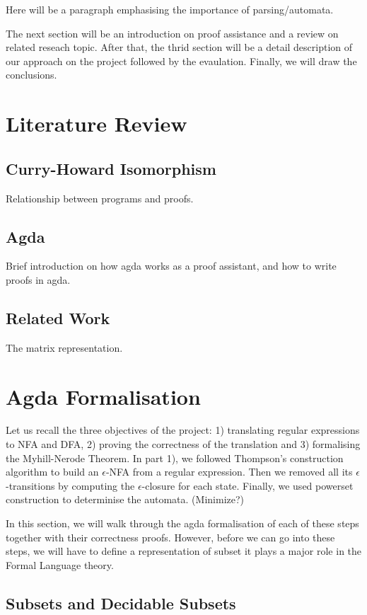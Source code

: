 \documentclass[twoside,openright,final]{bhamthesis}
\begin{document}
\par Here will be a paragraph emphasising the importance of
parsing/automata. 

\par The next section will be an introduction on proof assistance and
a review on related reseach topic. After that, the thrid section will
be a detail description of our approach on the project followed by the
evaulation. Finally, we will draw the conclusions. 


\section{Literature Review}
\subsection{Curry-Howard Isomorphism}
Relationship between programs and proofs.
\subsection{Agda}
Brief introduction on how agda works as a proof assistant, and how to
write proofs in agda.
\subsection{Related Work}
The matrix representation.


\section{Agda Formalisation}
Let us recall the three objectives of the project: 1) translating
regular expressions to NFA and DFA, 2) proving the correctness of the translation 
and 3) formalising the Myhill-Nerode Theorem. In part 1), we followed Thompson's
construction algorithm to build an \(\epsilon\)-NFA from a
regular expression. Then we removed all its \(\epsilon\)-transitions by computing the
\(\epsilon\)-closure for each state. Finally, we used powerset
construction to determinise the automata. (Minimize?) 

\par In this section, we will walk through the agda formalisation of
each of these steps together with their correctness proofs. However,
before we can go into these steps, we will have to define a
representation of subset it plays a major role in the Formal Language theory. 

\subsection{Subsets and Decidable Subsets}
\end{document}
